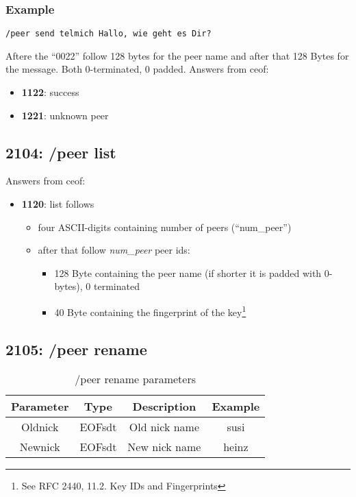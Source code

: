 \documentclass[12pt,a4paper]{book}
\begin{document}
\subsubsection{Example}
\begin{verbatim}
/peer send telmich Hallo, wie geht es Dir?
\end{verbatim}


Aftere the "`0022"' follow 128 bytes for the peer name
and after that 128 Bytes for the message.
Both 0-terminated, 0 padded.
Answers from ceof:
\begin{itemize}
\item \textbf{1122}: success
\item \textbf{1221}: unknown peer
\end{itemize}

\subsection{2104: /peer list}
Answers from ceof:
\begin{itemize}
\item \textbf{1120}: list follows
\begin{itemize}
\item four ASCII-digits containing number of peers ("`num\_peer"')
\item after that follow \textit{num\_peer} peer ids:
\begin{itemize}
\item 128 Byte containing the peer name (if shorter it is padded with 0-bytes), 0 terminated
\item 40 Byte containing the fingerprint of the
key\footnote{See RFC 2440, 11.2. Key IDs and Fingerprints}
\end{itemize}
\end{itemize}
\end{itemize}

\subsection{2105: /peer rename}
%
\begin{longtable}{|c|c|c|c|}
\caption{/peer rename parameters}\\
\hline
\textbf{Parameter} & \textbf{Type} & \textbf{Description} & \textbf{Example}\\
\hline
Oldnick & EOFsdt & Old nick name & susi\\
\hline
Newnick & EOFsdt & New nick name & heinz\\
\hline
\end{longtable}
\end{document}
